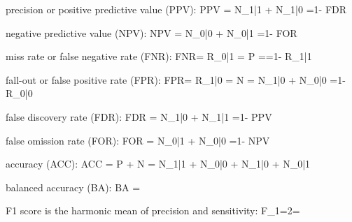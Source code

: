 precision or positive predictive value (PPV):
\beq 
{  {PPV} ={
{ {N_{1|1}} + {N_{1|0}} }}=1- {FDR} }
\eeq

negative predictive value (NPV):
\beq 
{  {NPV} ={
{ {N_{0|0}} + {N_{0|1}} }}=1- {FOR} }
\eeq

miss rate or false negative rate (FNR):
\beq FNR=
{  {R_{0|1}} ={
{ {P} }}={}=1- {R_{1|1}} }
\eeq

fall-out or false positive rate (FPR):
\beq FPR=
{  {R_{1|0}} ={
{ {N} }}={
{ {N_{1|0}} + {N_{0|0}} }}=1- {R_{0|0}} }
\eeq

false discovery rate (FDR):
\beq 
{  {FDR} ={
{ {N_{1|0}} + {N_{1|1}} }}=1- {PPV} }
\eeq

false omission rate (FOR):
\beq 
{  {FOR} ={
{ {N_{0|1}} + {N_{0|0}} }}=1- {NPV} }
\eeq


accuracy (ACC):
\beq 
{  {ACC} ={
{ {P} + {N} }}={
{ {N_{1|1}} + {N_{0|0}} + {N_{1|0}} + {N_{0|1}}
 }}}
\eeq

balanced accuracy (BA):
\beq 
{  {BA} ={}}
\eeq

F1 score
is the harmonic mean of precision and sensitivity: 
\beq 
{  {F}_{1}=2=
{}}
\eeq

